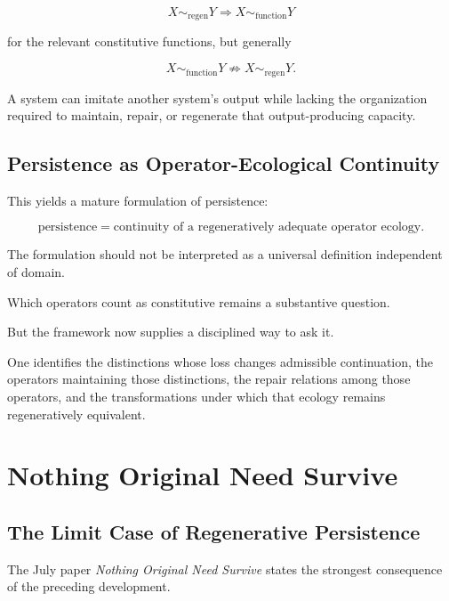 \documentclass[11pt]{article}
\theoremstyle{remark}
\begin{document}
\begin{equation}
X\sim_{\mathrm{regen}}Y
\Rightarrow
X\sim_{\mathrm{function}}Y
\end{equation}

for the relevant constitutive functions, but generally

\begin{equation}
X\sim_{\mathrm{function}}Y
\not\Rightarrow
X\sim_{\mathrm{regen}}Y.
\end{equation}

A system can imitate another system's output while lacking the organization required to maintain, repair, or regenerate that output-producing capacity.

\subsection{Persistence as Operator-Ecological Continuity}

This yields a mature formulation of persistence:

\begin{equation}
\boxed{
\text{persistence}
=
\text{continuity of a regeneratively adequate operator ecology}.
}
\end{equation}

The formulation should not be interpreted as a universal definition independent of domain.

Which operators count as constitutive remains a substantive question.

But the framework now supplies a disciplined way to ask it.

One identifies the distinctions whose loss changes admissible continuation, the operators maintaining those distinctions, the repair relations among those operators, and the transformations under which that ecology remains regeneratively equivalent.

\section{Nothing Original Need Survive}

\subsection{The Limit Case of Regenerative Persistence}

The July paper \emph{Nothing Original Need Survive} states the strongest consequence of the preceding development.
\end{document}
